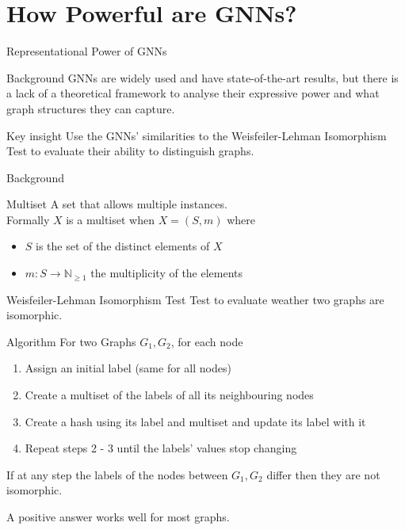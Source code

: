 \documentclass{beamer}
\theoremstyle{definition}
\begin{document}
\section{How Powerful are GNNs?}
\begin{frame}{Representational Power of GNNs}
    \begin{block}{Background}
    GNNs are widely used and have state-of-the-art results, but there is a lack of a theoretical framework to analyse their expressive power and what graph structures they can capture.
    \end{block} \pause
    \begin{block}{Key insight}
    Use the GNNs' similarities to the Weisfeiler-Lehman Isomorphism Test to evaluate their ability to distinguish graphs.
    \end{block}
\end{frame}

\begin{frame}{Background}
    \begin{block}{Multiset}
    A set that allows multiple instances.\\
    Formally $X$ is a multiset when $X = (S, m)$ where
    \begin{itemize}
        \item $S$ is the set of the distinct elements of $X$
        \item $m: S \rightarrow \mathbb{N}_{\geq1}$ the multiplicity of the elements
    \end{itemize}
    \end{block}
\end{frame}

\begin{frame}{Weisfeiler-Lehman Isomorphism Test}
    Test to evaluate weather two graphs are isomorphic.
    \begin{block}{Algorithm}
    For two Graphs $G_1, G_2$, for each node
    \begin{enumerate}
        \item Assign an initial label (same for all nodes)
        \item Create a multiset of the labels of all its neighbouring nodes
        \item Create a hash using its label and multiset and update its label with it 
        \item Repeat steps 2 - 3 until the labels' values stop changing
    \end{enumerate}
    If at any step the labels of the nodes between $G_1,G_2$ differ then they are not isomorphic.
    \end{block}
    A positive answer works well for most graphs.
\end{frame}
\end{document}
